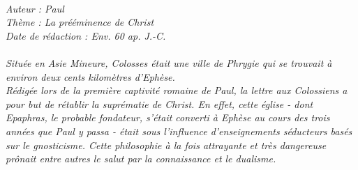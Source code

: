 \BFont
\noindent\hrulefill
{\footnotesize
\textit{
\bigskip
{\centering{}
\\Auteur : Paul
\\Thème : La prééminence de Christ
\\Date de rédaction : Env. 60 ap. J.-C.\\}
}
\textit{
\\Située en Asie Mineure, Colosses était une ville de Phrygie qui se trouvait à environ deux cents kilomètres d'Ephèse.
\\Rédigée lors de la première captivité romaine de Paul, la lettre aux Colossiens a pour but de rétablir la suprématie de Christ. En effet, cette église - dont Epaphras, le probable fondateur, s'était converti à Ephèse au cours des trois années que Paul y passa - était sous l'influence d'enseignements séducteurs basés sur le gnosticisme. Cette philosophie à la fois attrayante et très dangereuse prônait entre autres le salut par la connaissance et le dualisme.\bigskip
}
}
\par\nobreak\noindent\hrulefill
